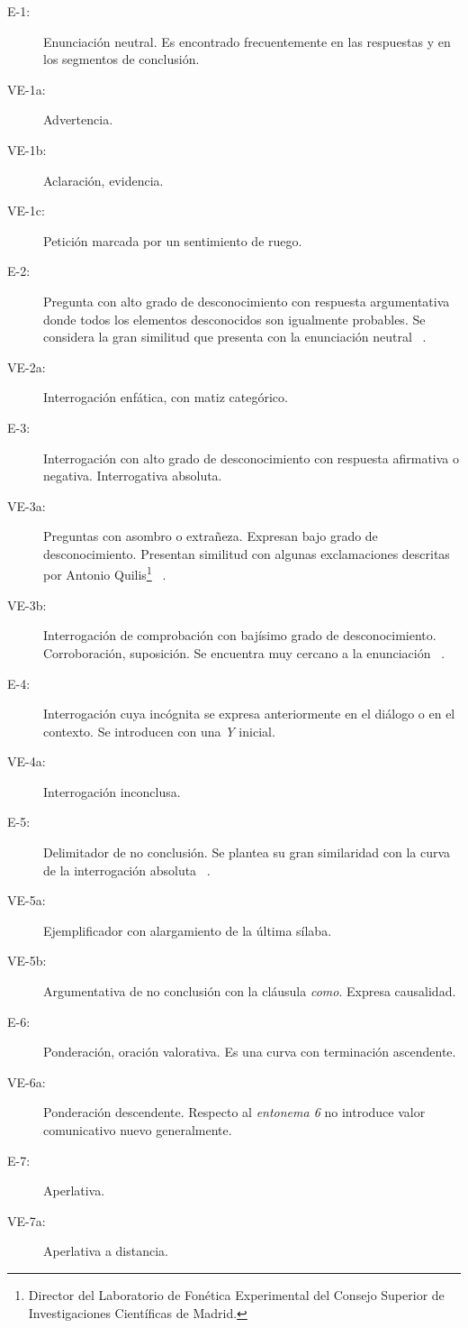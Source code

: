 \begin{description}
\item[E-1:]  Enunciaci\'on neutral. Es encontrado frecuentemente en las respuestas y en los segmentos de conclusi\'on.  
\item[VE-1a:]  Advertencia.
\item[ VE-1b:] Aclaraci\'on, evidencia. 
\item[ VE-1c:] Petici\'on marcada por un sentimiento de ruego. 
\item[ E-2:] Pregunta con alto grado de desconocimiento con respuesta argumentativa donde todos los elementos desconocidos son igualmente probables. Se considera la gran similitud que presenta con la enunciaci\'on neutral ~\cite[p.95]{garcia1996aspectos1}.
\item[ VE-2a:] Interrogaci\'on enf\'atica, con matiz categ\'orico.
\item[ E-3:] Interrogaci\'on con alto grado de desconocimiento con respuesta afirmativa o negativa.  Interrogativa absoluta.
\item[ VE-3a:] Preguntas con asombro o extrañeza. Expresan bajo grado de desconocimiento. Presentan similitud con algunas exclamaciones descritas por Antonio Quilis\footnote{Director del Laboratorio de Fon\'etica Experimental del Consejo Superior de Investigaciones Cient\'ificas de Madrid.} ~\cite[p.97, nota 13]{garcia1996aspectos1}.
\item[ VE-3b:] Interrogaci\'on de comprobaci\'on con baj\'isimo grado de desconocimiento. Corroboraci\'on, suposici\'on. Se encuentra muy cercano a la enunciaci\'on ~\cite[p.99]{garcia1996aspectos1}.
\item[ E-4:] Interrogaci\'on cuya inc\'ognita se expresa anteriormente en el di\'alogo o en el contexto. Se introducen con una \emph{Y} inicial.
\item[ VE-4a:] Interrogaci\'on inconclusa. 
\item[ E-5:] Delimitador de no conclusi\'on. Se plantea su gran similaridad con la curva de la interrogaci\'on absoluta ~\cite[p.104]{garcia1996aspectos1}. 
\item[ VE-5a:] Ejemplificador con alargamiento de la \'ultima s\'ilaba. 
\item[ VE-5b:] Argumentativa de no conclusi\'on con la cl\'ausula \emph{como}. Expresa causalidad.
\item[ E-6:] Ponderaci\'on, oraci\'on valorativa. Es una curva con terminaci\'on ascendente.
\item[ VE-6a:] Ponderaci\'on descendente. Respecto al \emph{entonema 6} no introduce valor comunicativo nuevo generalmente.
\item[ E-7:] Aperlativa.
\item[ VE-7a:] Aperlativa a distancia. 
\end{description}

